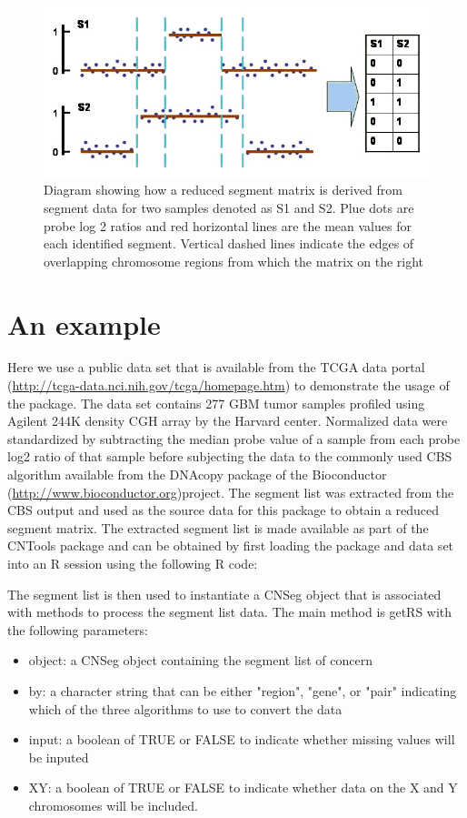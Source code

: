 \documentclass[12pt]{article}
\begin{document}
\begin{figure}[!htp]
\includegraphics{fig01}
\begin{center}
\caption{Diagram showing how a reduced segment matrix is derived from segment data for two samples denoted as S1 and S2. Plue dots are probe log 2 ratios and red horizontal lines are the mean values for each identified segment. Vertical dashed lines indicate the edges of overlapping chromosome regions from which the matrix on the right}\label{fig:fig01}
\end{center}
\end{figure}

\section*{An example}

Here we use a public data set that is available from the TCGA data portal (\url{http://tcga-data.nci.nih.gov/tcga/homepage.htm}) to demonstrate the usage of the package. The data set contains 277 GBM tumor samples profiled using Agilent 244K density CGH array by the Harvard center. Normalized data were standardized by subtracting the median probe value of a sample from each probe log2 ratio of that sample before subjecting the data to the commonly used CBS algorithm available from the DNAcopy package of the Bioconductor (\url{http://www.bioconductor.org})project. The segment list was extracted from the CBS output and used as the source data for this package to obtain a reduced segment matrix. The extracted segment list is made available as part of the CNTools package and can be obtained by first loading the package and data set into an R session using the following R code:


The segment list is then used to instantiate a CNSeg object that is associated with methods to process the segment list data. The main method is getRS with the following parameters: 

\begin{itemize}
\item object: a CNSeg object containing the segment list of concern
\item by: a character string that can be either "region", "gene", or "pair" indicating which of the three algorithms to use to convert the data
\item input: a boolean of TRUE or FALSE to indicate whether missing values will be inputed
\item XY: a boolean of TRUE or FALSE to indicate whether data on the X and Y chromosomes will be included.
\end{itemize}
\end{document}
